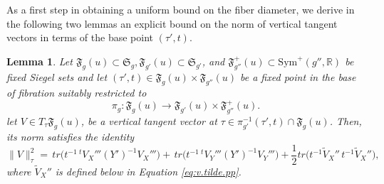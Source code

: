 \documentclass[11pt]{amsart}
\theoremstyle{plain}
\newtheorem{lemma}[theorem]{Lemma}
\theoremstyle{definition}
\theoremstyle{remark}
\newcommand{\R}{\mathbb R}
\newcommand{\fS}{\mathfrak{S}}
\newcommand{\sym}{\mathrm{Sym}^{\!+}}
\newcommand{\fF}{\mathfrak{F}}
\begin{document}
As a first step in obtaining a uniform bound on the fiber diameter, we derive in the 
following two lemmas an explicit bound on the norm of vertical tangent vectors in 
terms of the base point $(\tau', t)$.

\begin{lemma}
    \label{lem:vert.norm.exp}
    Let $\fF_{g}(u)\subset\fS_{g},\fF_{g'}(u)\subset\fS_{g'}$, and $\fF^{+}_{g''}(u)\subset\sym(g'',\R)$ be fixed Siegel sets and let $(\tau',t)\in \fF_g(u)\times\fF_{g''}(u)$ be a fixed point in the base of fibration suitably restricted to
    \[
    \pi_{g}:\fF_g(u)\longrightarrow\fF_{g'}(u)\times\fF^{+}_{g''}(u).
    \]
    let $V\in T_\tau \fF_g(u)$, be a vertical tangent vector at $\tau\in \pi^{-1}_{g'}(\tau',t)\cap \fF_g(u)$. Then, its norm satisfies the identity
    \begin{equation}
    \label{eq:normvert}
        \|V\|_{\tau}^2
        =
        \,tr\!\bigl(t^{-1}\,{}^tV_X'''(Y')^{-1}V_X'''\bigr)
        +
        \,tr\!\bigl(t^{-1}\,{}^tV_Y'''(Y')^{-1}V_Y'''\bigr)
        +
        \frac{1}{2}tr\!\bigl(t^{-1}\widetilde V_X''\,t^{-1}\widetilde V_X''\bigr),
    \end{equation}
    where $\widetilde V_X''$ is defined below in Equation \eqref{eq:v.tilde.pp}.
\end{lemma}
\end{document}
